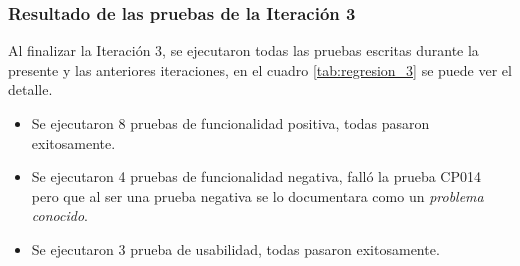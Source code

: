 \subsubsection{Resultado de las pruebas de la Iteración 3}

Al finalizar la Iteración 3, se ejecutaron todas las pruebas escritas durante la presente y las anteriores iteraciones, en el cuadro \ref{tab:regresion_3} se puede ver el detalle.


\begin{itemize}
  \item Se ejecutaron 8 pruebas de funcionalidad positiva, todas pasaron exitosamente.
  \item Se ejecutaron 4 pruebas de funcionalidad negativa, falló la prueba CP014 pero que al ser una prueba negativa se lo documentara como un \emph{problema conocido}.
  \item Se ejecutaron 3 prueba de usabilidad, todas pasaron exitosamente.
\end{itemize}
